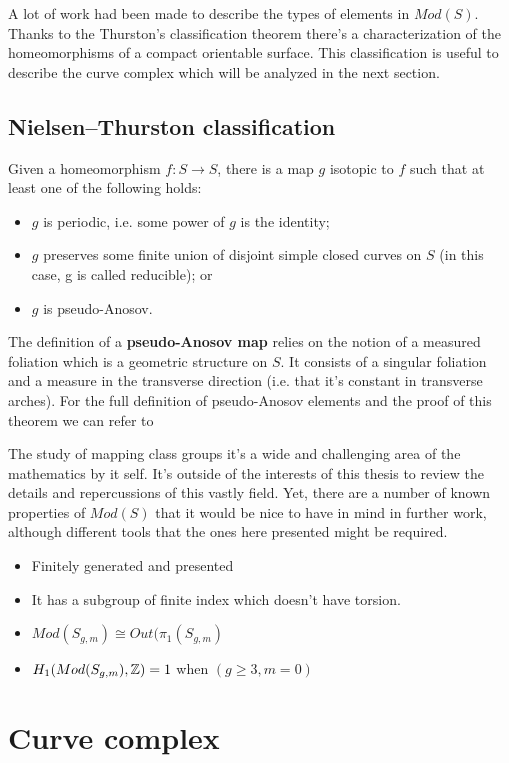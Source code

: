 A lot of work had been made to describe the types of elements in $Mod(S)$. Thanks to the Thurston's classification theorem there's a characterization of the homeomorphisms of a compact orientable surface. This classification is useful to describe the curve complex which will be analyzed in the next section.

\subsection{Nielsen–Thurston classification}
Given a homeomorphism $f: S \to  S$, there is a map $g$ isotopic to $f$ such that at least one of the following holds:

\begin{itemize}
\item $g$ is periodic, i.e. some power of $g$ is the identity;
\item $g$ preserves some finite union of disjoint simple closed curves on $S$ (in this case, g is called reducible); or
\item $g$ is pseudo-Anosov.
\end{itemize}

The definition of a \textbf{pseudo-Anosov map} relies on the notion of a measured foliation which is a geometric structure on $S$. It consists of a singular foliation and a measure in the transverse direction (i.e. that it's constant in transverse arches). For the full definition of pseudo-Anosov elements and the proof of this theorem we can refer to \cite[Farb, Chapter 13]{Farb}

The study of mapping class groups it's a wide and challenging area of the mathematics by it self. It's outside of the interests of this thesis to review the details and repercussions of this vastly field. Yet, there are a number of known properties of $Mod(S)$ that it would be nice to have in mind in further work, although different tools that the ones here presented might be required.

\begin{itemize}
\item Finitely generated and presented
\item It has a subgroup of finite index which doesn't have torsion.
\item $Mod(S_{g,m}) \cong Out(\pi_{1}(S_{g,m})$
\item $H_{1}(Mod(S_{g,m}), \mathbb{Z}) = 1$ when $(g\geq3, m=0)$
\end{itemize}

\section{Curve complex}

